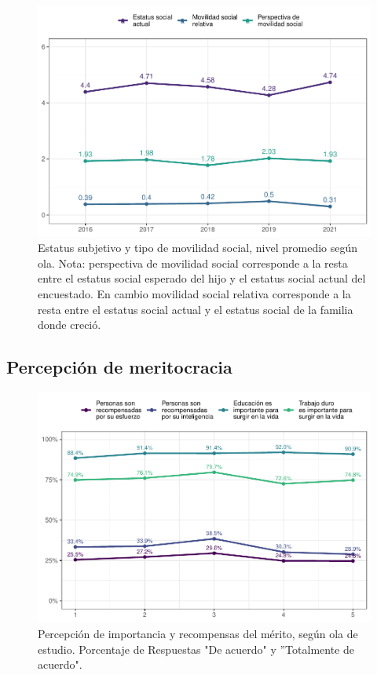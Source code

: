 \documentclass[
  12pt,
]{book}
\begin{document}
\begin{figure}

{\centering \includegraphics{reporte-elsoc_files/figure-latex/mov-soc-1} 

}

\caption{Estatus subjetivo y tipo de movilidad social, nivel promedio según ola.
Nota: perspectiva de movilidad social corresponde a la resta entre el estatus social esperado del hijo y el estatus social actual del encuestado. En cambio movilidad social relativa corresponde a la resta entre el estatus social actual y el estatus social de la familia donde creció.}\label{fig:mov-soc}
\end{figure}

\hypertarget{percepciuxf3n-de-meritocracia}{%
\subsection{Percepción de meritocracia}\label{percepciuxf3n-de-meritocracia}}

\begin{figure}

{\centering \includegraphics{reporte-elsoc_files/figure-latex/merit-wave-1} 

}

\caption{Percepción de importancia y recompensas del mérito, según ola de estudio. Porcentaje de Respuestas "De acuerdo" y ”Totalmente de acuerdo".}\label{fig:merit-wave}
\end{figure}
\end{document}
